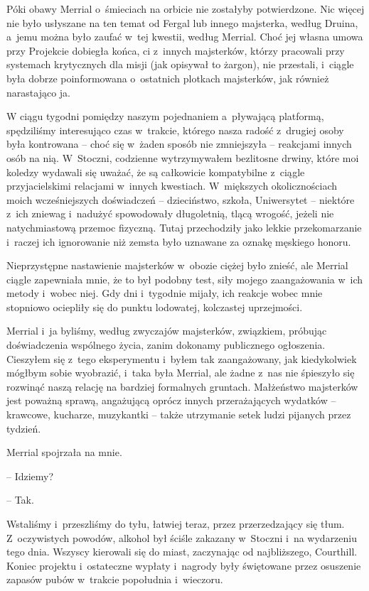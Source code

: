 \documentclass[oneside,polish,11pt,sfheadings]{mwbk}
\begin{document}
Póki obawy Merrial o~śmieciach na orbicie nie zostałyby potwierdzone.
Nic więcej nie było usłyszane na ten temat od Fergal lub innego
majsterka, według Druina, a~jemu można było zaufać w~tej kwestii, według
Merrial. Choć jej własna umowa przy Projekcie dobiegła końca, ci z~innych majsterków, którzy pracowali przy systemach krytycznych dla misji
(jak opisywał to żargon), nie przestali, i~ciągle była dobrze
poinformowana o~ostatnich plotkach majsterków, jak również narastająco
ja.

W ciągu tygodni pomiędzy naszym pojednaniem a~pływającą platformą,
spędziliśmy interesująco czas w~trakcie, którego nasza radość z~drugiej
osoby była kontrowana -- choć się w~żaden sposób nie zmniejszyła -- reakcjami innych osób na nią. W~Stoczni, codzienne wytrzymywałem
bezlitosne drwiny, które moi koledzy wydawali się uważać, że są
całkowicie kompatybilne z~ciągle przyjacielskimi relacjami w~innych
kwestiach. W~miększych okolicznościach moich wcześniejszych doświadczeń
-- dzieciństwo, szkoła, Uniwersytet -- niektóre z~ich zniewag i~nadużyć
spowodowały długoletnią, tlącą wrogość, jeżeli nie natychmiastową
przemoc fizyczną. Tutaj przechodziły jako lekkie przekomarzanie i~raczej
ich ignorowanie niż zemsta było uznawane za oznakę męskiego honoru.

Nieprzystępne nastawienie majsterków w~obozie ciężej było znieść, ale
Merrial ciągle zapewniała mnie, że to był podobny test, siły mojego
zaangażowania w~ich metody i~wobec niej. Gdy dni i~tygodnie mijały, ich
reakcje wobec mnie stopniowo ociepliły się do punktu lodowatej,
kolczastej uprzejmości.

Merrial i~ja byliśmy, według zwyczajów majsterków, związkiem, próbując
doświadczenia wspólnego życia, zanim dokonamy publicznego ogłoszenia.
Cieszyłem się z~tego eksperymentu i~byłem tak zaangażowany, jak
kiedykolwiek mógłbym sobie wyobrazić, i~taka była Merrial, ale żadne z~nas nie śpieszyło się rozwinąć naszą relację na bardziej formalnych
gruntach. Małżeństwo majsterków jest poważną sprawą, angażującą oprócz
innych przerażających wydatków -- krawcowe, kucharze, muzykantki -- także
utrzymanie setek ludzi pijanych przez tydzień.

Merrial spojrzała na mnie.

-- Idziemy?

-- Tak.

Wstaliśmy i~przeszliśmy do tyłu, łatwiej teraz, przez przerzedzający się
tłum. Z~oczywistych powodów, alkohol był ściśle zakazany w~Stoczni i~na
wydarzeniu tego dnia. Wszyscy kierowali się do miast, zaczynając od
najbliższego, Courthill. Koniec projektu i~ostateczne wypłaty i~nagrody
były świętowane przez osuszenie zapasów pubów w~trakcie popołudnia i~wieczoru.
\end{document}
